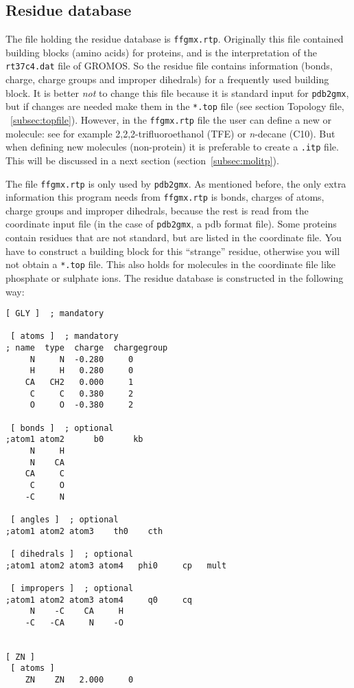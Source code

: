 \subsection{Residue database}
\label{subsec:rtp}
The file holding the residue database is {\tt ffgmx.rtp}. Originally
this file contained building blocks (amino acids) for proteins, and is
the {\gromacs} interpretation of the {\tt rt37c4.dat} file of GROMOS. So
the residue file contains information (bonds, charge, charge groups
and improper dihedrals) for a frequently used building block. It is
better {\em not} to change this file because it is standard input for
\verb'pdb2gmx', but if changes are needed make them in the
\verb'*.top' file (see section Topology file, ~\ref{subsec:topfile}). 
However, in the {\tt ffgmx.rtp} file the user can define a new
 or molecule: see for example 2,2,2-trifluoroethanol
(TFE) or {\em n}-decane (C10). But when defining new molecules
(non-protein) it is preferable to create a {\tt *.itp}
file. This will be discussed in a next section (section~\ref{subsec:molitp}).

The file {\tt ffgmx.rtp} is only used by \verb'pdb2gmx'.
As mentioned before, the only extra information this
program needs from {\tt ffgmx.rtp} is bonds, charges of atoms,
charge groups and improper dihedrals, because the rest is read from
the coordinate input file (in the case of \verb'pdb2gmx', a pdb format
file). Some proteins contain residues that are not standard, but are
listed in the coordinate file. You have to construct a building block
for this ``strange'' residue, otherwise you will not obtain a
\verb'*.top' file. This also holds for molecules in the
coordinate file like phosphate or sulphate ions.
The residue database is constructed in the following way:
{\small\begin{verbatim}
[ GLY ]  ; mandatory

 [ atoms ]  ; mandatory 
; name  type  charge  chargegroup 
     N     N  -0.280     0
     H     H   0.280     0
    CA   CH2   0.000     1
     C     C   0.380     2
     O     O  -0.380     2

 [ bonds ]  ; optional
;atom1 atom2      b0      kb
     N     H
     N    CA
    CA     C
     C     O
    -C     N

 [ angles ]  ; optional
;atom1 atom2 atom3    th0    cth

 [ dihedrals ]  ; optional
;atom1 atom2 atom3 atom4   phi0     cp   mult

 [ impropers ]  ; optional
;atom1 atom2 atom3 atom4     q0     cq
     N    -C    CA     H
    -C   -CA     N    -O


[ ZN ]
 [ atoms ]
    ZN    ZN   2.000     0
\end{verbatim}}


